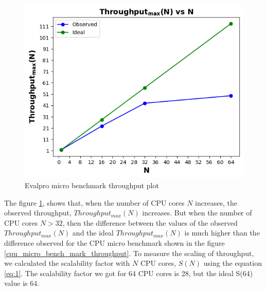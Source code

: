 \documentclass[sigconf]{acmart}
\begin{document}
\begin{figure}[!htb]
  \centering
  \includegraphics[width=\linewidth]{Pictures/evalpro_micro_benchmark_throughput.png}
  \caption{Evalpro micro benchmark throughput plot}
  \label{evalpro_micro_bench_mark_throughput}
\end{figure}

The figure \ref{evalpro_micro_bench_mark_throughput}, shows that, when the number of CPU cores $N$ increases, the observed throughput, $Throughput_{max}(N)$ increases. But when the number of CPU cores $N>32$, then the difference between the values of the observed  $Throughput_{max}(N)$  and the ideal $Throughput_{max}(N)$ is much higher than the difference observed for the CPU micro benchmark shown in the figure \ref{cpu_micro_bench_mark_throughput}. To measure the scaling of throughput, we calculated the scalability factor with $N$ CPU cores, $S(N)$ using the equation \ref{eq:1}. The scalability factor we got for 64 CPU cores is 28, but the ideal  S(64) value is 64.
\end{document}
